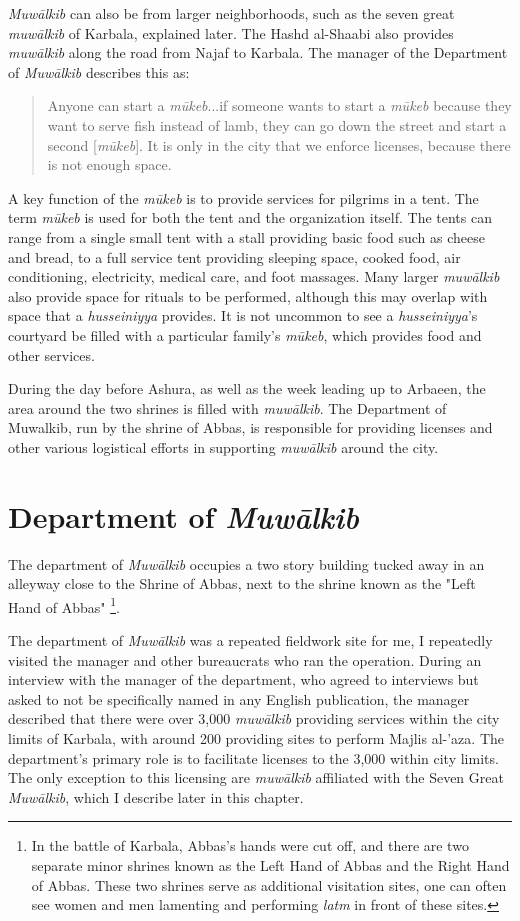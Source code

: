 \emph{Muwālkib} can also be from larger neighborhoods, such as the seven great \emph{muwālkib} of Karbala, explained later. The Hashd al-Shaabi also provides \emph{muwālkib} along the road from Najaf to Karbala. The manager of the Department of \emph{Muwālkib} describes this as:

\begin{quote}
    Anyone can start a \emph{mūkeb}...if someone wants to start a \emph{mūkeb} because they want to serve fish instead of lamb, they can go down the street and start a second [\emph{mūkeb}]. It is only in the city that we enforce licenses, because there is not enough space.
\end{quote}

A key function of the \emph{mūkeb} is to provide services for pilgrims in a tent. The term \emph{mūkeb} is used for both the tent and the organization itself. The tents can range from a single small tent with a stall providing basic food such as cheese and bread, to a full service tent providing sleeping space, cooked food, air conditioning, electricity, medical care, and foot massages. Many larger \emph{muwālkib} also provide space for rituals to be performed, although this may overlap with space that a \emph{husseiniyya} provides. It is not uncommon to see a \emph{husseiniyya}'s courtyard be filled with a particular family's \emph{mūkeb}, which provides food and other services. 

During the day before Ashura, as well as the week leading up to Arbaeen, the area around the two shrines is filled with \emph{muwālkib}. The Department of Muwalkib, run by the shrine of Abbas, is responsible for providing licenses and other various logistical efforts in supporting \emph{muwālkib} around the city.

\section{Department of \emph{Muwālkib}}
The department of \emph{Muwālkib} occupies a two story building tucked away in an alleyway close to the Shrine of Abbas, next to the shrine known as the "Left Hand of Abbas" \footnote{In the battle of Karbala, Abbas's hands were cut off, and there are two separate minor shrines known as the Left Hand of Abbas and the Right Hand of Abbas. These two shrines serve as additional visitation sites, one can often see women and men lamenting and performing \emph{latm} in front of these sites.}. 

The department of \emph{Muwālkib} was a repeated fieldwork site for me, I repeatedly visited the manager and other bureaucrats who ran the operation. During an interview with the manager of the department, who agreed to interviews but asked to not be specifically named in any English publication, the manager described that there were over 3,000 \emph{muwālkib} providing services within the city limits of Karbala, with around 200 providing sites to perform Majlis al-'aza. The department's primary role is to facilitate licenses to the 3,000 within city limits. The only exception to this licensing are \emph{muwālkib} affiliated with the Seven Great \emph{Muwālkib}, which I describe later in this chapter. 

